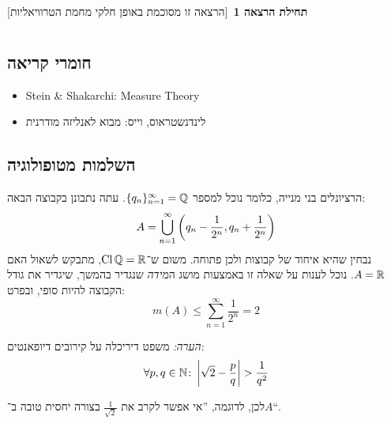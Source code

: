 \documentclass[name=רשימות פונקציות ממשיות – WIP]{../../../tex/classes/noChapterMegasumPreamble}
\newcommand \lectext[1] {{\color{blue}\textbf{#1}}}
\newcommand \firstlec   {\lectext{תחילת הרצאה 1}}
\begin{document}
	\newpage
	\setcounter{tocdepth}{3} %
	\tableofcontents


	\firstlec \ [הרצאה זו מסוכמת באופן חלקי מחמת הטרוויאליות]
	
	\section[מבואות למיניהם]{}
	\subsection{חומרי קריאה}
	
	\begin{itemize}
		\item Stein \& Shakarchi: Measure Theory
		\item לינדנשטראוס, וייס: מבוא לאנליזה מודרנית 
	\end{itemize}
	
	\subsection{השלמות מטופולוגיה}
	הרציונלים בני מנייה, כלומר נוכל למספר $\{q_n\}_{n = 1}^{\infty} = \mathbb{Q}$. עתה נתבונן בקבוצה הבאה: 
	\[ A = \bigcup_{n = 1}^{\infty}\left ( q_n - \frac{1}{2^{n}}, q_n + \frac{1}{2^{n}} \right ) \]
	נבחין שהיא איחוד של קבוצות ולכן פתוחה. משום ש־$\operatorname{Cl} \mathbb{Q} = \mathbb{R}$, מתבקש לשאול האם $A = \mathbb{R}$. נוכל לענות על שאלה זו באמצעות מושג ה\textit{מידה} שנגדיר בהמשך, שיגדיר את גודל הקבוצה להיות סופי, ובפרט: 
	\[ m(A) \le \sum_{n = 1}^{\infty} \frac{1}{2^{n}} = 2 \]
	
	\textit{הערה: }משפט דיריכלה על קירובים דיופאנטים: 
	\[ \forall p, q \in \mathbb{N}\colon \left \lvert \sqrt 2 - \frac{p}{q} \right \rvert > \frac{1}{q^{2}} \]
	
	לכן, לדוגמה, ''אי אפשר לקרב את $\frac{1}{\sqrt 2}$ בצורה יחסית טובה ב־$A$``. 
	
\end{document}
